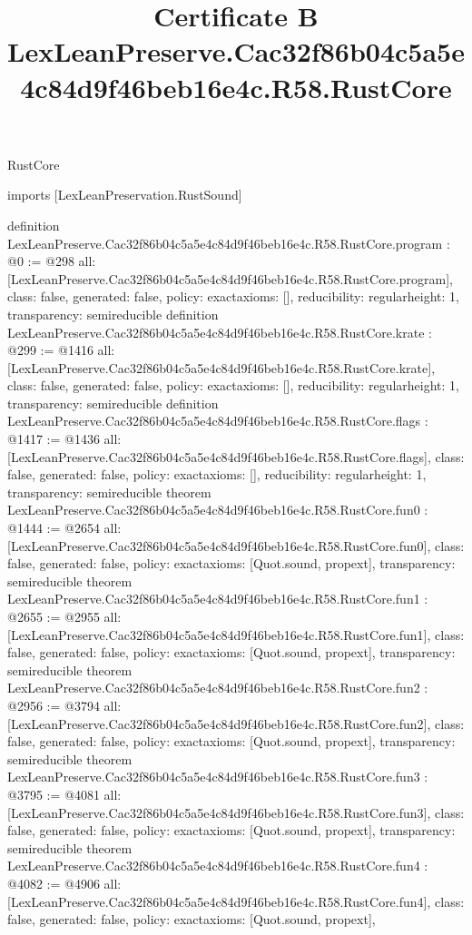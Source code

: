 \begin{lexlean}{RustCore}
\title{Certificate B LexLeanPreserve.Cac32f86b04c5a5e4c84d9f46beb16e4c.R58.RustCore}
\begin{coremodule}
imports [LexLeanPreservation.RustSound]

definition LexLeanPreserve.Cac32f86b04c5a5e4c84d9f46beb16e4c.R58.RustCore.program : @0 := @298 {
  all: [LexLeanPreserve.Cac32f86b04c5a5e4c84d9f46beb16e4c.R58.RustCore.program],
  class: false,
  generated: false,
  policy: exact{axioms: []},
  reducibility: regular{height: 1},
  transparency: semireducible
}
definition LexLeanPreserve.Cac32f86b04c5a5e4c84d9f46beb16e4c.R58.RustCore.krate : @299 := @1416 {
  all: [LexLeanPreserve.Cac32f86b04c5a5e4c84d9f46beb16e4c.R58.RustCore.krate],
  class: false,
  generated: false,
  policy: exact{axioms: []},
  reducibility: regular{height: 1},
  transparency: semireducible
}
definition LexLeanPreserve.Cac32f86b04c5a5e4c84d9f46beb16e4c.R58.RustCore.flags : @1417 := @1436 {
  all: [LexLeanPreserve.Cac32f86b04c5a5e4c84d9f46beb16e4c.R58.RustCore.flags],
  class: false,
  generated: false,
  policy: exact{axioms: []},
  reducibility: regular{height: 1},
  transparency: semireducible
}
theorem LexLeanPreserve.Cac32f86b04c5a5e4c84d9f46beb16e4c.R58.RustCore.fun0 : @1444 := @2654 {
  all: [LexLeanPreserve.Cac32f86b04c5a5e4c84d9f46beb16e4c.R58.RustCore.fun0],
  class: false,
  generated: false,
  policy: exact{axioms: [Quot.sound, propext]},
  transparency: semireducible
}
theorem LexLeanPreserve.Cac32f86b04c5a5e4c84d9f46beb16e4c.R58.RustCore.fun1 : @2655 := @2955 {
  all: [LexLeanPreserve.Cac32f86b04c5a5e4c84d9f46beb16e4c.R58.RustCore.fun1],
  class: false,
  generated: false,
  policy: exact{axioms: [Quot.sound, propext]},
  transparency: semireducible
}
theorem LexLeanPreserve.Cac32f86b04c5a5e4c84d9f46beb16e4c.R58.RustCore.fun2 : @2956 := @3794 {
  all: [LexLeanPreserve.Cac32f86b04c5a5e4c84d9f46beb16e4c.R58.RustCore.fun2],
  class: false,
  generated: false,
  policy: exact{axioms: [Quot.sound, propext]},
  transparency: semireducible
}
theorem LexLeanPreserve.Cac32f86b04c5a5e4c84d9f46beb16e4c.R58.RustCore.fun3 : @3795 := @4081 {
  all: [LexLeanPreserve.Cac32f86b04c5a5e4c84d9f46beb16e4c.R58.RustCore.fun3],
  class: false,
  generated: false,
  policy: exact{axioms: [Quot.sound, propext]},
  transparency: semireducible
}
theorem LexLeanPreserve.Cac32f86b04c5a5e4c84d9f46beb16e4c.R58.RustCore.fun4 : @4082 := @4906 {
  all: [LexLeanPreserve.Cac32f86b04c5a5e4c84d9f46beb16e4c.R58.RustCore.fun4],
  class: false,
  generated: false,
  policy: exact{axioms: [Quot.sound, propext]},
}
\end{coremodule}
\end{lexlean}
